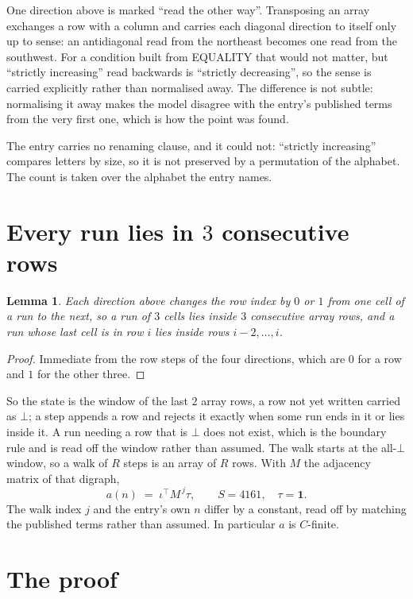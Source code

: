 \documentclass[11pt,a4paper]{article}
\theoremstyle{plain}
\newtheorem{lemma}[theorem]{Lemma}
\theoremstyle{definition}
\begin{document}
One direction above is marked ``read the other way''. Transposing an array exchanges a row with
a column and carries each diagonal direction to itself only up to sense: an antidiagonal read
from the northeast becomes one read from the southwest. For a condition built from EQUALITY
that would not matter, but ``strictly increasing'' read backwards is ``strictly decreasing'',
so the sense is carried explicitly rather than normalised away. The
difference is not subtle: normalising it away makes the model disagree with the entry's
published terms from the very first one, which is how the point was found.

The entry carries no renaming clause, and it could not: ``strictly increasing'' compares
letters by size, so it is not preserved by a permutation of the alphabet. The count is taken
over the alphabet the entry names.

\section{Every run lies in $3$ consecutive rows}

\begin{lemma}\label{lem:win}
Each direction above changes the row index by $0$ or $1$ from one cell of a run to the next, so
a run of $3$ cells lies inside $3$ consecutive array rows, and a run whose last cell is in
row $i$ lies inside rows $i-2,\dots,i$.
\end{lemma}

\begin{proof}
Immediate from the row steps of the four directions, which are $0$ for a row and $1$ for the
other three.
\end{proof}

So the state is the window of the last $2$ array rows, a row not yet written carried as
$\bot$; a step appends a row and rejects it exactly when some run ends in it or lies inside it.
A run needing a row that is $\bot$ does not exist, which is the boundary rule and is read off
the window rather than assumed. The walk starts at the all-$\bot$ window, so a walk of $R$ steps
is an array of $R$ rows. With $M$ the adjacency matrix of that digraph,
\[
a(n)\;=\;\iota^{\!\top}M^{\,j}\tau ,\qquad S=4161,\quad\tau=\mathbf{1} .
\]
The walk index $j$ and the entry's own $n$ differ by a constant, read off by matching the
published terms rather than assumed. In particular $a$ is $C$-finite.

\section{The proof}
\end{document}

